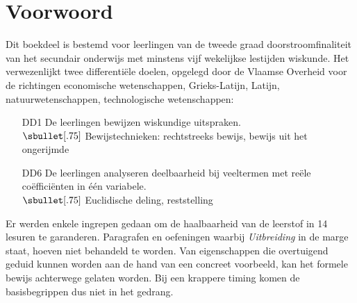 \documentclass{ximera}
\begin{document}




\chapter{Voorwoord}

Dit boekdeel is bestemd voor leerlingen van de tweede graad doorstroomfinaliteit van het secundair onderwijs met minstens vijf wekelijkse lestijden wiskunde. Het verwezenlijkt twee differenti\"ele doelen, opgelegd door de Vlaamse Overheid voor de richtingen economische wetenschappen, Grieks-Latijn, Latijn, natuurwetenschappen, technologische wetenschappen:
\begin{center}
\begin{minipage}{13cm}\itshape
\begin{enumerate}
\item[DD1]
De leerlingen bewijzen wiskundige uitspraken. \\
$\sbullet[.75]$ Bewijstechnieken: rechtstreeks bewijs, bewijs uit het ongerijmde
\item[DD6]
De leerlingen analyseren deelbaarheid bij veeltermen met re\"ele co\"efficiënten in \'e\'en variabele. \\
$\sbullet[.75]$ Euclidische deling, reststelling
\end{enumerate}
\end{minipage}
\end{center}
Er werden enkele ingrepen gedaan om de haalbaarheid van de leerstof in 14 lesuren te garanderen. Paragrafen en oefeningen waarbij \textit{Uitbreiding} in de marge staat, hoeven niet behandeld te worden. Van eigenschappen die overtuigend geduid kunnen worden aan de hand van een concreet voorbeeld, kan het formele bewijs achterwege gelaten worden. Bij een krappere timing komen de basisbegrippen dus niet in het gedrang.
\end{document}
